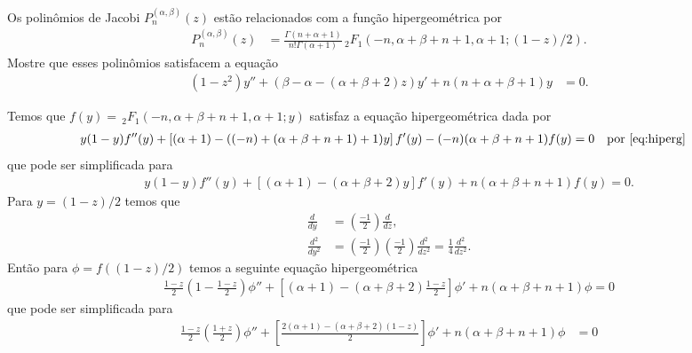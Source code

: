 \documentclass[a4paper,10pt, leqno, answers]{exam}  %
\begin{document}
\begin{questions}
     Os polin\^{o}mios de Jacobi $P_n^{(\alpha, \beta)}(z)$ est\~{a}o relacionados com a fun\c{c}\~{a}o hipergeom\'{e}trica por
    \begin{align*}
        P_n^{(\alpha, \beta)}(z) &= \frac{\Gamma(n + \alpha + 1)}{n! \Gamma(\alpha + 1)} \,_2F_1(-n, \alpha + \beta + n + 1, \alpha + 1; (1 - z) / 2).
    \end{align*}
    Mostre que esses polinômios satisfacem a equa\c{c}\~{a}o
    \begin{align*}
        (1 - z^2) y'' + (\beta - \alpha - (\alpha + \beta + 2)z)y' + n(n + \alpha + \beta + 1)y &= 0.
    \end{align*}
    \begin{solution}
        Temos que $f(y) = \,_2F_1(-n, \alpha + \beta + n + 1, \alpha + 1; y)$ satisfaz a equa\c{c}\~{a}o hipergeom\'{e}trica dada por
        \begin{align*}
            y (1 - y) f''(y) + \left[ (\alpha + 1) - ( (-n) + (\alpha + \beta + n + 1) + 1)y \right] f'(y) - (-n) (\alpha + \beta + n + 1) f(y) &= 0 && \text{por \eqref{eq:hiperg}}
        \end{align*}
        que pode ser simplificada para
        \begin{align*}
            y (1 - y) f''(y) + \left[ (\alpha + 1) - (\alpha + \beta + 2)y \right] f'(y) + n (\alpha + \beta + n + 1) f(y) = 0.
        \end{align*}
        Para $y = (1 - z)/2$ temos que
        \begin{align}
            \frac{d}{dy} &= \left( \frac{-1}{2} \right) \frac{d}{dz}, \\
            \frac{d^2}{dy^2} &= \left( \frac{-1}{2} \right) \left( \frac{-1}{2} \right) \frac{d^2}{dz^2} = \frac{1}{4} \frac{d^2}{dz^2}.
        \end{align}
        Ent\~{a}o para $\phi = f( (1 - z)/2 )$ temos a seguinte equa\c{c}\~{a}o hipergeom\'{e}trica
        \begin{align*}
            \frac{1 - z}{2} \left( 1 - \frac{1 - z}{2} \right) \phi'' + \left[ (\alpha + 1) - (\alpha + \beta + 2) \frac{1 - z}{2} \right] \phi' + n (\alpha + \beta + n + 1) \phi = 0
        \end{align*}
        que pode ser simplificada para
        \begin{align*}
            \frac{1 - z}{2} \left( \frac{1 + z}{2} \right) \phi'' + \left[ \frac{2(\alpha + 1) - (\alpha + \beta + 2) (1 - z)}{2} \right] \phi' + n (\alpha + \beta + n + 1) \phi &= 0 \\

\end{align*}
\end{solution}
\end{questions}
\end{document}
